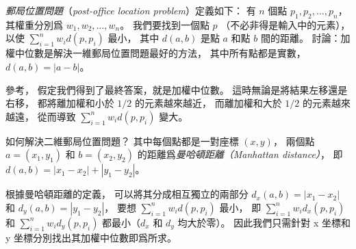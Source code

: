 \emph{郵局位置問題}（\emph{post-office location problem}）定義如下：
有 $n$ 個點 $p_1,p_2,\ldots,p_n$，
其權重分別爲 $w_1,w_2,\ldots,w_n$。
我們要找到一個點 $p$ （不必非得是輸入中的元素），
以使 $\sum_{i=1}^{n}w_i d(p,p_i)$ 最小，
其中 $d(a,b)$ 是點 $a$ 和點 $b$ 間的距離。
\startigBase[continue]\startitem
討論：加權中位數是解決一維郵局位置問題最好的方法，
其中所有點都是實數， $d(a,b)=|a-b|$。
\stopitem\stopigBase

\startANSWER
參考，
假定我們得到了最終答案，就是加權中位數。
這時無論是將結果左移還是右移，
都將離加權和小於 $1/2$ 的元素越來越近，
而離加權和大於 $1/2$ 的元素越來越遠，
從而導致 $\sum_{i=1}^{n}w_i d(p,p_i)$ 變大。
\stopANSWER

\startigBase[continue]\startitem
如何解決二維郵局位置問題？
其中每個點都是一對座標 $(x,y)$，
兩個點 $a=(x_1,y_1)$ 和 $b=(x_2,y_2)$ 的距離爲\emph{曼哈頓距離（Manhattan distance）}，
即 $d(a,b)=|x_1-x_2| + |y_1 - y_2|$。
\stopitem\stopigBase

\startANSWER
根據曼哈頓距離的定義，
可以將其分成相互獨立的兩部分 $d_x(a,b)=|x_1-x_2|$ 和 $d_y(a,b)=|y_1-y_2|$，
要想 $\sum_{i=1}^{n}w_i d(p,p_i)$ 最小，
即 $\sum_{i=1}^{n}w_i d_x(p,p_i)$ 和 $\sum_{i=1}^{n}w_i d_y(p,p_i)$ 都最小（$d_x$ 和 $d_y$ 均大於零）。
因此我們只需針對 x 坐標和 y 坐標分別找出其加權中位數即爲所求。
\stopANSWER

\stopPROBLEM
